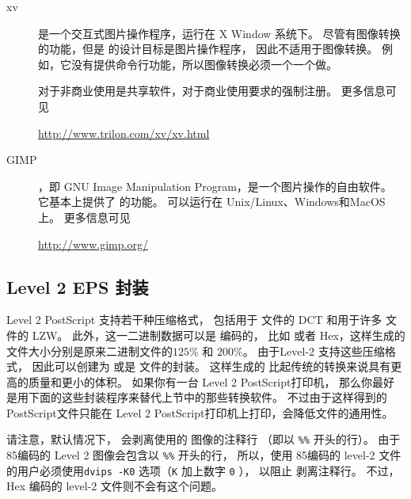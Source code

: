 \begin{description}
	\item[xv]
	
	 是一个交互式图片操作程序，运行在 X Window 系统下。
	尽管有图像转换的功能，但是  的设计目标是图片操作程序，
	因此不适用于图像转换。
	例如，它没有提供命令行功能，所以图像转换必须一个一个做。
	
	 对于非商业使用是共享软件，对于商业使用要求的强制注册。
	更多信息可见
	\begin{center}
		\url{http://www.trilon.com/xv/xv.html}
	\end{center}
	
	\item[GIMP]	
	
	，即 GNU Image Manipulation Program，是一个图片操作的自由软件。
	它基本上提供了   的功能。
	 可以运行在 Unix/Linux、Windows和MacOS上。
	更多信息可见
	\begin{center}
		\url{http://www.gimp.org/}
	\end{center}

\end{description}


\subsection{Level 2 EPS 封装}\label{ssec:epswrapper}
Level 2 PostScript 支持若干种压缩格式，
包括用于  文件的 DCT 和用于许多  文件的 LZW。
此外，这一二进制数据可以是 \ascii 编码的，
比如  或者 \ascii Hex，这样生成的\ascii 文件大小分别是原来二进制文件的$125\percent$ 和 $200\percent$。
由于Level-2 支持这些压缩格式，
因此可以创建为  或是  文件的封装。
这样生成的  比起传统的转换来说具有更高的质量和更小的体积。
如果你有一台 Level 2 PostScript打印机，
那么你最好是用下面的这些封装程序来替代上节中的那些转换软件。
不过由于这样得到的PostScript文件只能在 Level 2 PostScript打印机上打印，会降低文件的通用性。

请注意，默认情况下， 会剥离使用的  图像的注释行
（即以 \texttt{\%\%} 开头的行）。
由于\ascii85编码的 Level 2 图像会包含以 \texttt{\%\%} 开头的行，
所以，使用 \ascii85编码的 level-2  文件的用户必须使用\verb|dvips -K0| 选项（\texttt{K} 加上数字 \texttt{0} ），
以阻止  剥离注释行。
不过，\ascii Hex 编码的 level-2 文件则不会有这个问题。

